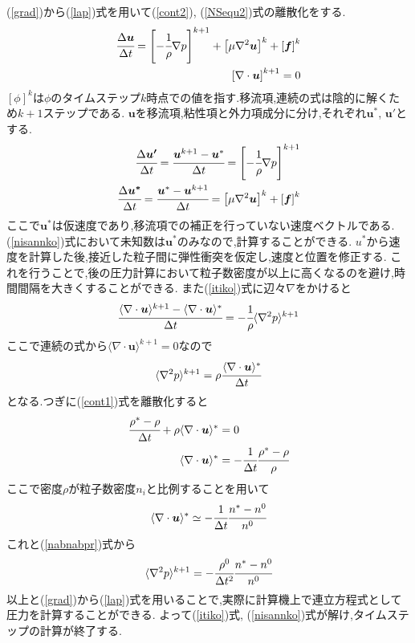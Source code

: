 (\ref{grad})から(\ref{lap})式を用いて(\ref{cont2}), (\ref{NSequ2})式の離散化をする.
\begin{align}
    \cfrac{\Delta \bm{u}}{\Delta t}=\left[-\cfrac{1}{\rho}\nabla p\right]^{k+1}+\left[\mu\nabla^2\bm{u}\right]^k+\left[\bm{f}\right]^k\\
    \left[\nabla\cdot\bm{u}\right]^{k+1}=0
\end{align}
$[\phi]^k$は$\phi$のタイムステップ$k$時点での値を指す.移流項,連続の式は陰的に解くため$k+1$ステップである.
$\bm{u}$を移流項,粘性項と外力項成分に分け,それぞれ$\bm{u}^*$, $\bm{u}'$とする.
\begin{align}
    \label{itiko}
    \cfrac{\Delta \bm{u'}}{\Delta t}=\cfrac{\bm{u}^{k+1}-\bm{u}^*}{\Delta t}=\left[-\cfrac{1}{\rho}\nabla p\right]^{k+1}\\
    \label{nisannko}
    \cfrac{\Delta \bm{u^*}}{\Delta t}=\cfrac{\bm{u}^*-\bm{u}^{k+1}}{\Delta t}=\left[\mu\nabla^2\bm{u}\right]^k+\left[\bm{f}\right]^k
\end{align}
ここで$\bm{u}^*$は仮速度であり,移流項での補正を行っていない速度ベクトルである.
(\ref{nisannko})式において未知数は$\bm{u}^*$のみなので,計算することができる.
$u^*$から速度を計算した後,接近した粒子間に弾性衝突を仮定し,速度と位置を修正する.
これを行うことで,後の圧力計算において粒子数密度が以上に高くなるのを避け,時間間隔を大きくすることができる.
また(\ref{itiko})式に辺々$\nabla$をかけると
\begin{align}
    \cfrac{\langle\nabla\cdot\bm{u}\rangle^{k+1}-\langle\nabla\cdot\bm{u}\rangle^{*}}{\Delta t}=-\cfrac{1}{\rho}\langle\nabla^2p\rangle^{k+1}
\end{align}
ここで連続の式から$\langle\nabla\cdot\bm{u}\rangle^{k+1}=0$なので
\begin{align}
    \label{nabnabpr}
    \langle\nabla^2p\rangle^{k+1}=\rho\cfrac{\langle\nabla\cdot\bm{u}\rangle^{*}}{\Delta t}
\end{align}
となる.つぎに(\ref{cont1})式を離散化すると
\begin{align}
    \cfrac{\rho^*-\rho}{\Delta t}+\rho\langle\nabla\cdot\bm{u}\rangle^*&=0\\
    \langle\nabla\cdot\bm{u}\rangle^*&=-\cfrac{1}{\Delta t}\cfrac{\rho^*-\rho}{\rho}
\end{align}
ここで密度$\rho$が粒子数密度$n_i$と比例することを用いて
\begin{align}
    \langle\nabla\cdot\bm{u}\rangle^*\simeq-\cfrac{1}{\Delta t}\cfrac{n^*-n^0}{n^0}
\end{align}
これと(\ref{nabnabpr})式から
\begin{align}
    \label{nabnabpn}
    \langle\nabla^2p\rangle^{k+1}=-\cfrac{\rho^0}{\Delta t^2}\cfrac{n^*-n^0}{n^0}
\end{align}
以上と(\ref{grad})から(\ref{lap})式を用いることで,実際に計算機上で連立方程式として圧力を計算することができる.
よって(\ref{itiko})式, (\ref{nisannko})式が解け,タイムステップの計算が終了する.\cite{ryuusinyuumon}
